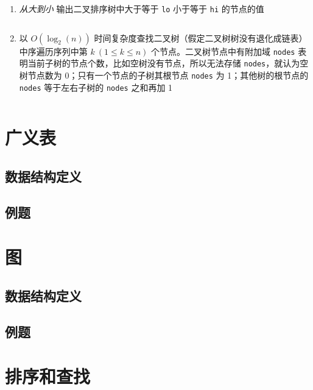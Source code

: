 \documentclass{ctexart}
\begin{document}
\begin{enumerate}
    \item \emph{从大到小} 输出二叉排序树中大于等于 \texttt{lo} 小于等于 \texttt{hi} 的节点的值
        \inputminted{c}{codes/print-from-hi-to-lo-in-bsttree.c}

    \item 以 $O(\log_2(n))$ 时间复杂度查找二叉树（假定二叉树树没有退化成链表）中序遍历序列中第 $k\ (1 \le k \le n)$ 个节点。二叉树节点中有附加域 \texttt{nodes} 表明当前子树的节点个数，比如空树没有节点，所以无法存储 \texttt{nodes}，就认为空树节点数为 0；只有一个节点的子树其根节点 \texttt{nodes} 为 1；其他树的根节点的 \texttt{nodes} 等于左右子树的 \texttt{nodes} 之和再加 1
        \inputminted{c}{codes/find-kth-node-in-bitree.c}

\end{enumerate}


\section{广义表}
\subsection{数据结构定义}

\subsection{例题}



\section{图}
\subsection{数据结构定义}


\subsection{例题}


\section{排序和查找}
\end{document}
